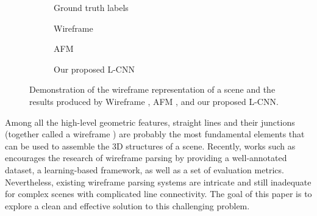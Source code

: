 \documentclass[10pt,twocolumn,letterpaper]{article}
\begin{document}
\begin{figure}[t]
    \centering
    \begin{subfigure}[b]{0.42\linewidth}
    \caption{Ground truth labels}
    \end{subfigure}
    \hspace{8pt}
    \begin{subfigure}[b]{0.42\linewidth}
    \caption{Wireframe \cite{Huang:2018:LPW}}
    \end{subfigure}
    
    \vspace{5pt}

    \begin{subfigure}[b]{0.42\linewidth}
    \caption{AFM \cite{xue2018learning}}
    \end{subfigure}
    \hspace{8pt}
    \begin{subfigure}[b]{0.42\linewidth}
    \caption{Our proposed L-CNN}
    \end{subfigure}
    \caption{Demonstration of the wireframe representation of a scene and the results produced by Wireframe \cite{Huang:2018:LPW}, AFM \cite{xue2018learning}, and our proposed L-CNN.}
    \label{fig:teaser}
\end{figure}
Among all the high-level geometric features, straight lines and their junctions (together called a wireframe \cite{Huang:2018:LPW}) are probably the most fundamental elements that can be used to assemble the 3D structures of a scene. Recently, works such as \cite{Huang:2018:LPW} encourages the research of wireframe parsing by providing a well-annotated dataset, a learning-based framework, as well as a set of evaluation metrics. Nevertheless, existing wireframe parsing systems are intricate and still inadequate for complex scenes with complicated line connectivity. The goal of this paper is to explore a clean and effective solution to this challenging problem. 
\end{document}
